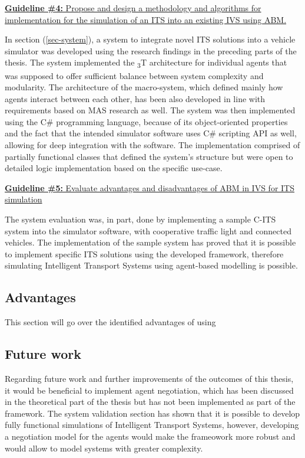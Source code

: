 \documentclass[main.tex]{subfiles}
\begin{document}
\ul{\textbf{Guideline \#4:} Propose and design a methodology and algorithms for implementation for the 
simulation of an ITS into an existing IVS using ABM.}

In section (\ref{sec-system}), a system to integrate novel ITS solutions into a vehicle simulator was developed using the research findings in the 
preceding parts of the thesis. The system implemented the \textsubscript{3}T architecture for individual agents that was supposed 
to offer sufficient balance between system complexity and modularity. The architecture of the macro-system, which defined mainly 
how agents interact between each other, has been also developed in line with requirements based on MAS research as well. The 
system was then implemented using the C\# programming language, because of its object-oriented properties and the fact that 
the intended simulator software uses C\# scripting API as well, allowing for deep integration with the software. The implementation comprised of partially functional classes that 
defined the system's structure but were open to detailed logic implementation based on the specific use-case. 

\ul{\textbf{Guideline \#5:} Evaluate advantages and disadvantages of ABM in IVS for ITS simulation}

The system evaluation was, in part, done by implementing a sample C-ITS system into the simulator software, with cooperative 
traffic light and connected vehicles. The implementation of the sample system has proved that it is possible to implement specific 
ITS solutions using the developed framework, therefore simulating Intelligent Transport Systems using agent-based modelling is 
possible.

\subsection{Advantages}

This section will go over the identified advantages of using 

\subsection{Future work}

Regarding future work and further improvements of the outcomes of this thesis, it would be beneficial to implement agent negotiation, which 
has been discussed in the theoretical part of the thesis but has not been implemented as part of the framework. The system validation section 
has shown that it is possible to develop fully functional simulations of Intelligent Transport Systems, however, developing a negotiation model 
for the agents would make the frameowork more robust and would allow to model systems with greater complexity. 
\end{document}
